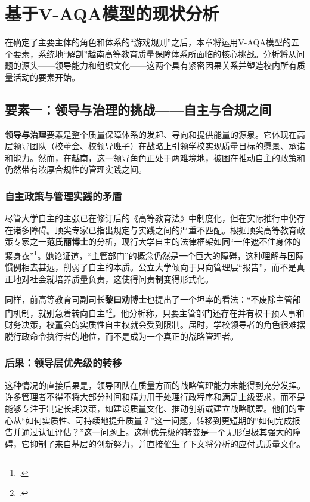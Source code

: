 



\section{基于V-AQA模型的现状分析}
\label{sec:phan_tich_vqa}

在确定了主要主体的角色和体系的“游戏规则”之后，本章将运用V-AQA模型的五个要素，系统地“解剖”越南高等教育质量保障体系所面临的核心挑战。分析将从问题的源头——领导能力和组织文化——这两个具有紧密因果关系并塑造校内所有质量活动的要素开始。

\subsection{要素一：领导与治理的挑战——自主与合规之间}
\label{subsec:thach_thuc_lanhdao}

\textbf{领导与治理}要素是整个质量保障体系的发起、导向和提供能量的源泉。它体现在高层领导团队（校董会、校领导班子）在战略上引领学校实现质量目标的愿景、承诺和能力。然而，在越南，这一领导角色正处于两难境地，被困在推动自主的政策和仍然带有浓厚合规性的管理实践之间。

\subsubsection{自主政策与管理实践的矛盾}
尽管大学自主的主张已在修订后的《高等教育法》中制度化，但在实际推行中仍存在诸多障碍。顶尖专家已指出规定与实践之间的严重不匹配。根据顶尖高等教育政策专家之一\textbf{范氏丽博士}的分析，现行大学自主的法律框架如同“一件遮不住身体的紧身衣”\footcite{lypham_aosat_2024}。她论证道，“主管部门”的概念仍然是一个巨大的障碍，这种理解与国际惯例相去甚远，削弱了自主的本质。公立大学倾向于只向管理层“报告”，而不是真正地对社会就培养质量负责，这使得问责制变得形式化。

同样，前高等教育司副司长\textbf{黎曰劝博士}也提出了一个坦率的看法：“不废除主管部门机制，就别急着转向自主”\footcite{khuyen_bochuquan_2022}。他分析称，只要主管部门还存在并有权干预人事和财务决策，校董会的实质性自主权就会受到限制。届时，学校领导者的角色很难摆脱行政命令执行者的地位，而不是成为一个真正的战略管理者。

\subsubsection{后果：领导层优先级的转移}
这种情况的直接后果是，领导团队在质量方面的战略管理能力未能得到充分发挥。许多管理者不得不将大部分时间和精力用于处理行政程序和满足上级要求，而不是能够专注于制定长期决策，如建设质量文化、推动创新或建立战略联盟。他们的重心从“如何实质性、可持续地提升质量？”这一问题，转移到更短期的“如何完成报告并通过认证评估？”这一问题上。这种优先级的转变是一个无形但极其强大的障碍，它抑制了来自基层的创新努力，并直接催生了下文将分析的应付式质量文化。

